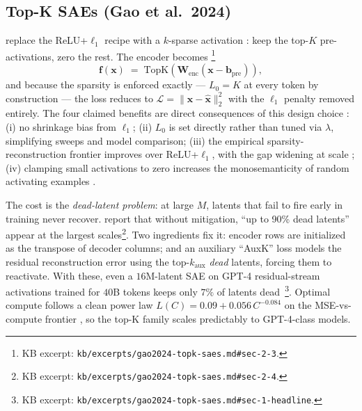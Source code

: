 \subsection{Top-K SAEs (Gao et al.\ 2024)}
\label{sec:sae-topk}

\citet{gao2024-topk-saes} replace the ReLU+$\ell_1$ recipe with a
$k$-sparse activation \citep[after][]{gao2024-topk-saes}: keep the
top-$K$ pre-activations, zero the rest. The encoder becomes
\citep[\S 2.3, Eq.~2]{gao2024-topk-saes}\footnote{KB excerpt:
\texttt{kb/excerpts/gao2024-topk-saes.md\#sec-2-3}.}
\begin{equation}
  \mathbf{f}(\mathbf{x}) \;=\; \mathrm{TopK}\!\left(\mathbf{W}_{\text{enc}}(\mathbf{x} - \mathbf{b}_{\text{pre}})\right),
  \label{eq:topk}
\end{equation}
and because the sparsity is enforced exactly --- $L_0 = K$ at every
token by construction --- the loss reduces to
$\mathcal{L} = \|\mathbf{x} - \hat{\mathbf{x}}\|_2^2$ with the $\ell_1$
penalty removed entirely. The four claimed benefits are direct
consequences of this design choice
\citep[\S 2.3]{gao2024-topk-saes}: (i) no shrinkage bias from $\ell_1$;
(ii) $L_0$ is set directly rather than tuned via $\lambda$, simplifying
sweeps and model comparison; (iii) the empirical sparsity-reconstruction
frontier improves over ReLU+$\ell_1$, with the gap widening at scale
\citep[Fig.~2b]{gao2024-topk-saes}; (iv) clamping small activations to
zero increases the monosemanticity of random activating examples
\citep[\S 4.3]{gao2024-topk-saes}.

The cost is the \emph{dead-latent problem}: at large $M$, latents that
fail to fire early in training never recover. \citet{gao2024-topk-saes}
report that without mitigation, ``up to 90\% dead
latents''~\citep[\S 2.4]{gao2024-topk-saes} appear at the largest
scales\footnote{KB excerpt:
\texttt{kb/excerpts/gao2024-topk-saes.md\#sec-2-4}.}. Two ingredients
fix it: encoder rows are initialized as the transpose of decoder
columns; and an auxiliary ``AuxK'' loss models the residual
reconstruction error using the top-$k_{\text{aux}}$ \emph{dead}
latents, forcing them to reactivate. With these, even a
$16$M-latent SAE on GPT-4 residual-stream activations trained for $40$B
tokens keeps only $7\%$ of latents
dead~\citep[\S 1, \S 2.4]{gao2024-topk-saes}\footnote{KB excerpt:
\texttt{kb/excerpts/gao2024-topk-saes.md\#sec-1-headline}.}. Optimal
compute follows a clean power law $L(C) = 0.09 + 0.056\,C^{-0.084}$ on
the MSE-vs-compute frontier \citep[Fig.~1, \S 3]{gao2024-topk-saes}, so
the top-K family scales predictably to GPT-4-class models.

